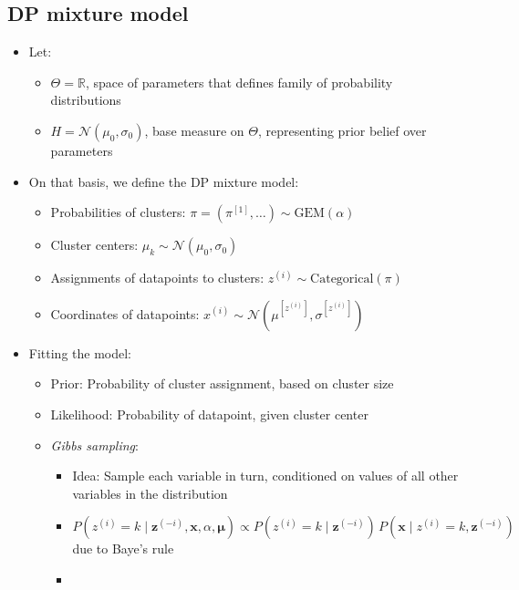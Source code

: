 \subsection*{DP mixture model}
\begin{itemize}
    \item Let:
    \begin{itemize}
        \item $\Theta = \mathbb{R}$, space of parameters that defines family of probability distributions
        \item $H = \mathcal{N}(\mu_0, \sigma_0)$, base measure on $\Theta$, representing prior belief over parameters
    \end{itemize}
    \item On that basis, we define the DP mixture model:
    \begin{itemize}
        \item Probabilities of clusters:
        $
        \pi = (\pi^{[1]}, \dots) \sim \textrm{GEM}(\alpha)
        $
        \item Cluster centers:
        $
        \mu_k \sim \mathcal{N}(\mu_0, \sigma_0)
        $
        \item Assignments of datapoints to clusters:
        $
        z^{(i)} \sim \textrm{Categorical}(\pi)
        $
        \item Coordinates of datapoints:
        $
        x^{(i)} \sim \mathcal{N}(\mu^{[z^{(i)}]}, \sigma^{[z^{(i)}]})
        $
    \end{itemize}
    \item Fitting the model:
    \begin{itemize}
        \item Prior: Probability of cluster assignment, based on cluster size
        \item Likelihood: Probability of datapoint, given cluster center
        \item \emph{Gibbs sampling}:
        \begin{itemize}
            \item Idea: Sample each variable in turn, conditioned on values of all other variables in the distribution
            \item 
            $
            P(z^{(i)} = k \mid \boldsymbol{z}^{(-i)}, \boldsymbol{x}, \alpha, \boldsymbol{\mu}) 
            \propto P(z^{(i)} = k \mid \boldsymbol{z}^{(-i)}) \, P(\boldsymbol{x} \mid z^{(i)} = k, \boldsymbol{z}^{(-i)})
            $ due to Baye's rule
            \item 

\end{itemize}
\end{itemize}
\end{itemize}
